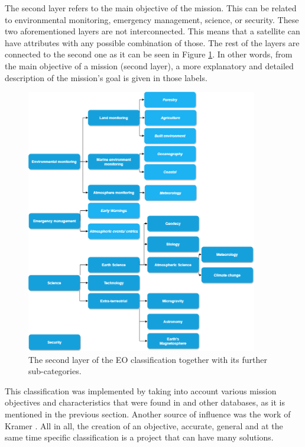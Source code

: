 The second layer refers to the main objective of the mission. This can be related to environmental monitoring, emergency management, science, or security. These two aforementioned layers are not interconnected. This means that a satellite can have attributes with any possible combination of those. The rest of the layers are connected to the second one as it can be seen in Figure \ref{classification_2nd_layer}. In other words, from the main objective of a mission (second layer), a more explanatory and detailed description of the mission's goal is given in those labels.

\begin{figure}
\centering
\includegraphics[width=0.9\textwidth]{Images/classification_2nd_layer.png}\caption{The second layer of the EO classification together with its further sub-categories.}
\label{classification_2nd_layer}
\end{figure}

This classification was implemented by taking into account various mission objectives and characteristics that were found in \cite{Newspace} and other databases, as it is mentioned in the previous section. Another source of influence was the work of Kramer \cite{Kramer 2002}. All in all, the creation of an objective, accurate, general and at the same time specific classification is a project that can have many solutions.

